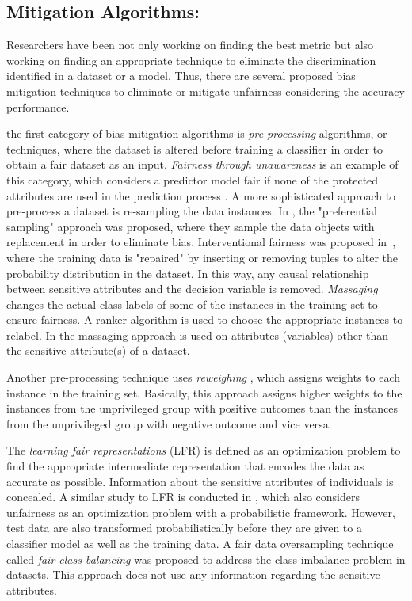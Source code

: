 \subsection{Mitigation Algorithms:}
Researchers have been not only working on finding the best metric but also working on finding an appropriate technique to eliminate the discrimination identified in a dataset or a model. Thus, there are several proposed bias mitigation techniques to eliminate or mitigate unfairness considering the accuracy performance.

 the first category of bias mitigation algorithms is \emph{pre-processing} algorithms, or techniques, where the dataset is altered before training a classifier in order to obtain a fair dataset as an input. \emph{Fairness through unawareness} is an example of this category, which considers a predictor model fair if none of the protected attributes are used in the prediction process \cite{gajane2017formalizing}. A more sophisticated approach to pre-process a dataset is re-sampling the data instances. In \cite{kamiran2010preferential_samp},  the "preferential sampling" approach was proposed, where they sample the data objects with replacement in order to eliminate bias.  
Interventional fairness was proposed in~\cite{salimi2019capuchin}, where the training data is "repaired" by inserting or removing tuples to alter the probability distribution in the dataset. In this way, any causal relationship between sensitive attributes and the decision variable is removed. 
\emph{Massaging} \cite{kamiran2012data-preproc} changes the actual class labels of some of the instances in the training set to ensure fairness. A ranker algorithm is used to choose the appropriate instances to relabel.
In \cite{feldman2015certifying} the massaging approach is used on attributes (variables) other than the sensitive attribute(s) of a dataset. 

Another pre-processing technique uses \emph{reweighing} \cite{calders2009reweighing}, which assigns weights to each instance in the training set. Basically, this approach assigns higher weights to the instances from the unprivileged group with positive outcomes than the instances from the unprivileged group with negative outcome and vice versa. 

The \emph{learning fair representations} (LFR) \cite{zemel2013fair_learning} is defined as an optimization problem to find the appropriate intermediate representation that encodes the data as accurate as possible. Information about the sensitive attributes of individuals is concealed. 
A similar study to LFR \cite{zemel2013fair_learning} is conducted in \cite{calmon2017optimized_pre}, which also considers unfairness as an optimization problem with a probabilistic framework. However, test data are also transformed probabilistically before they are given to a classifier model as well as the training data. 
A fair data oversampling technique called \emph{fair class balancing} \cite{yan2020fair-balance} was proposed to address the class imbalance problem in datasets. This approach does not use any information regarding the sensitive attributes.  


